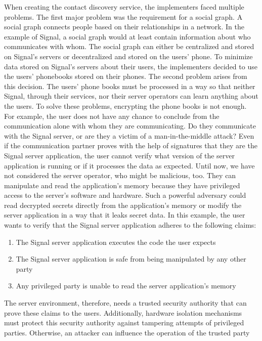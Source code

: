 When creating the contact discovery service, the implementers faced multiple
problems. The first major problem was the requirement for a social graph. A
social graph connects people based on their relationships in a network. In the
example of Signal, a social graph would at least contain information about who
communicates with whom. The social graph can either be centralized and stored on
Signal's servers or decentralized and stored on the users' phone. To minimize
data stored on Signal's servers about their users, the implementers decided to
use the users' phonebooks stored on their phones. The second problem arises from
this decision. The users' phone books must be processed in a way so that neither
Signal, through their services, nor their server operators can learn anything
about the users. To solve these problems, encrypting the phone books is not
enough. For example, the user does not have any chance to conclude from the
communication alone with whom they are communicating. Do they communicate with
the Signal server, or are they a victim of a man-in-the-middle attack? Even if
the communication partner proves with the help of signatures that they are the
Signal server application, the user cannot verify what version of the server
application is running or if it processes the data as expected. Until now, we
have not considered the server operator, who might be malicious, too. They can
manipulate and read the application's memory because they have privileged access
to the server's software and hardware. Such a powerful adversary could read
decrypted secrets directly from the application's memory or modify the server
application in a way that it leaks secret data. In this example, the user wants
to verify that the Signal server application adheres to the following claims:
\begin{enumerate}
  \item The Signal server application executes the code the user expects
  \item The Signal server application is safe from being manipulated by
    any other party
  \item Any privileged party is unable to read the server application's
    memory
\end{enumerate}
The server environment, therefore, needs a trusted security authority that can
prove these claims to the users. Additionally, hardware isolation mechanisms
must protect this security authority against tampering attempts of privileged
parties. Otherwise, an attacker can influence the operation of the trusted party
